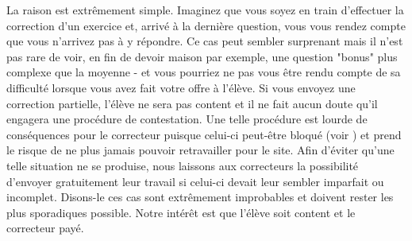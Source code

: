 ﻿La raison est extrêmement simple. Imaginez que vous soyez en train d'effectuer la correction d'un exercice et, arrivé à la dernière question, vous vous rendez compte que vous n'arrivez pas à y répondre. Ce cas peut sembler surprenant mais il n'est pas rare de voir, en fin de devoir maison par exemple, une question "bonus" plus complexe que la moyenne - et vous pourriez ne pas vous être rendu compte de sa difficulté lorsque vous avez fait votre offre à l'élève. Si vous envoyez une correction partielle, l'élève ne sera pas content et il ne fait aucun doute qu'il engagera une procédure de contestation. Une telle procédure est lourde de conséquences pour le correcteur puisque celui-ci peut-être bloqué (voir ) et prend le risque de ne plus jamais pouvoir retravailler pour le site. Afin d'éviter qu'une telle situation ne se produise, nous laissons aux correcteurs la possibilité d'envoyer gratuitement leur travail si celui-ci devait leur sembler imparfait ou incomplet.
Disons-le ces cas sont extrêmement improbables et doivent rester les plus sporadiques possible. Notre intérêt est que l'élève soit content et le correcteur payé.